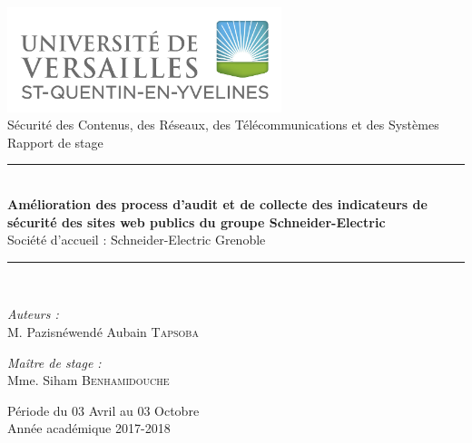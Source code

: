 \documentclass[a4paper,12pt]{book}
\theoremstyle{break}
\begin{document}

\begin{titlepage}
\begin{center}

\includegraphics[width=0.6\textwidth]{uvsq-logo-rvb-def}\\[1cm]

{\large Sécurité des Contenus, des Réseaux, des Télécommunications et des Systèmes}\\[0.5cm]

{\large Rapport de stage}\\[0.5cm]

\rule{\linewidth}{0.5mm} \\[0.4cm]
{ \huge \bfseries Amélioration des process d'audit et de collecte des indicateurs de sécurité des sites web publics du groupe Schneider-Electric\\[0.4cm] }
Société d'accueil : Schneider-Electric Grenoble
\rule{\linewidth}{0.5mm} \\[1.5cm]


\noindent
\begin{minipage}{0.4\textwidth}
  \begin{flushleft} \large
    \emph{Auteurs :}\\
    M. Pazisnéwendé Aubain  \textsc{Tapsoba}\\

  \end{flushleft}
\end{minipage}%
\begin{minipage}{0.4\textwidth}
  \begin{flushright} \large
    \emph{Maître de stage :} \\
    Mme. Siham \textsc{Benhamidouche}\\
  
  \end{flushright}
\end{minipage}

\vfill

{\large Période du 03 Avril au 03 Octobre \\ Année académique 2017-2018}

\end{center}
\end{titlepage}
\end{document}
